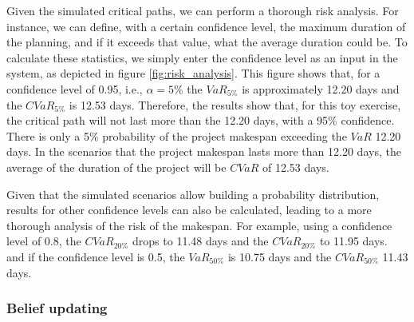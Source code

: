 Given the simulated critical paths, we can perform a thorough risk analysis. For instance, we can define, with a certain confidence level, the maximum duration of the planning, and if it exceeds that value, what the average duration could be. To calculate these statistics, we simply enter the confidence level as an input in the system, as depicted in figure \ref{fig:risk_analysis}. This figure shows that, for a confidence level of 0.95, i.e., $\alpha = 5\%$ the $VaR_{5\%}$ is approximately 12.20 days and the $CVaR_{5\%}$ is 12.53 days. Therefore, the results show that, for this toy exercise, the critical path will not last more than the 12.20 days, with a 95\% confidence. There is only a 5\% probability of the project makespan exceeding the $VaR$ 12.20 days. In the scenarios that the project makespan lasts more than 12.20 days, the average of the duration of the project will be $CVaR$ of 12.53 days. 

Given that the simulated scenarios allow building a probability distribution, results for other confidence levels can also be calculated, leading to a more thorough analysis of the risk of the makespan. For example, using a confidence level of 0.8, the $CVaR_{20\%}$ drops to 11.48 days and the $CVaR_{20\%}$ to 11.95 days. and if the confidence level is 0.5, the $VaR_{50\%}$ is 10.75 days and the $CVaR_{50\%}$ 11.43 days. %


\subsubsection{Belief updating}


